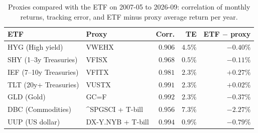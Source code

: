 \documentclass[11pt,a4paper]{article}
\begin{document}
\begin{table}[htbp]
\centering
\caption{Proxies compared with the ETF on 2007-05 to 2026-09: correlation of monthly returns, tracking error,
and ETF minus proxy average return per year.}
\label{tab:proxy}
\small
\begin{tabular}{@{}llrrr@{}}
\toprule
ETF & Proxy & Corr. & TE & ETF $-$ proxy \\
\midrule
HYG (High yield) & VWEHX & $0.906$ & $4.5\%$ & $-0.40\%$ \\
SHY (1--3y Treasuries) & VFISX & $0.968$ & $0.5\%$ & $-0.11\%$ \\
IEF (7--10y Treasuries) & VFITX & $0.981$ & $2.3\%$ & $+0.27\%$ \\
TLT (20y+ Treasuries) & VUSTX & $0.991$ & $2.3\%$ & $+0.02\%$ \\
GLD (Gold) & GC=F & $0.992$ & $2.3\%$ & $-0.37\%$ \\
DBC (Commodities) & \^{}SPGSCI + T-bill & $0.956$ & $7.3\%$ & $-2.27\%$ \\
UUP (US dollar) & DX-Y.NYB + T-bill & $0.994$ & $0.9\%$ & $-0.79\%$ \\
\bottomrule
\end{tabular}
\end{table}
\end{document}
